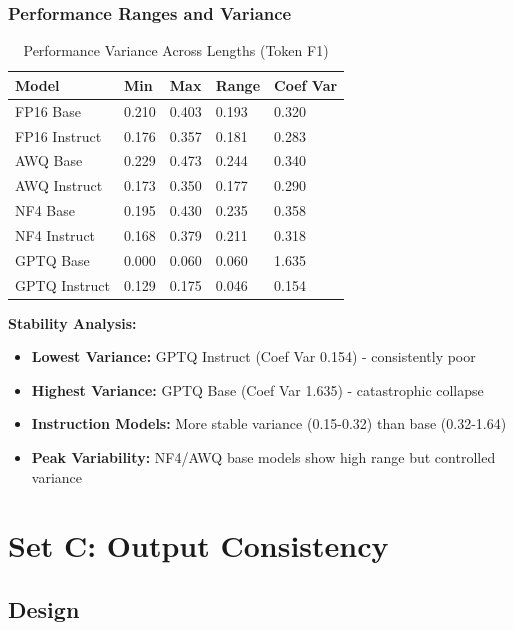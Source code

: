 \documentclass[11pt,a4paper]{article}
\begin{document}
\subsubsection{Performance Ranges and Variance}

\begin{table}[H]
\centering
\caption{Performance Variance Across Lengths (Token F1)}
\small
\begin{tabularx}{\textwidth}{@{}X C{1.8cm} C{1.8cm} C{1.8cm} C{1.8cm}@{}}
\toprule
\textbf{Model} & \textbf{Min} & \textbf{Max} & \textbf{Range} & \textbf{Coef Var} \\
\midrule
FP16 Base & 0.210 & 0.403 & 0.193 & 0.320 \\
FP16 Instruct & 0.176 & 0.357 & 0.181 & 0.283 \\
AWQ Base & 0.229 & 0.473 & 0.244 & 0.340 \\
AWQ Instruct & 0.173 & 0.350 & 0.177 & 0.290 \\
NF4 Base & 0.195 & 0.430 & 0.235 & 0.358 \\
NF4 Instruct & 0.168 & 0.379 & 0.211 & 0.318 \\
GPTQ Base & 0.000 & 0.060 & 0.060 & 1.635 \\
GPTQ Instruct & 0.129 & 0.175 & 0.046 & 0.154 \\
\bottomrule
\end{tabularx}
\end{table}

\textbf{Stability Analysis:}
\begin{itemize}
\item \textbf{Lowest Variance:} GPTQ Instruct (Coef Var 0.154) - consistently poor
\item \textbf{Highest Variance:} GPTQ Base (Coef Var 1.635) - catastrophic collapse
\item \textbf{Instruction Models:} More stable variance (0.15-0.32) than base (0.32-1.64)
\item \textbf{Peak Variability:} NF4/AWQ base models show high range but controlled variance
\end{itemize}

\newpage
\section{Set C: Output Consistency}

\subsection{Design}
\end{document}
